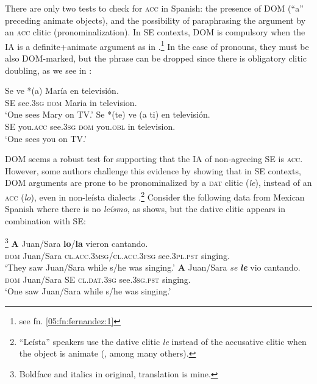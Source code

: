 \documentclass[output=paper,colorlinks,citecolor=brown]{langscibook}
\begin{document}
There are only two tests to check for \textsc{acc} in Spanish: the presence of DOM (``a'' preceding animate objects), and the possibility of paraphrasing the argument by an \textsc{acc} clitic (pronominalization). In SE contexts, DOM is compulsory when the IA is a definite+animate argument as in .\footnote{see fn. \ref{05:fn:fernandez:1}} In the case of pronouns, they must be also DOM-marked, but the phrase can be dropped since there is obligatory clitic doubling, as we see in :

\ea\label{ex:05:DOM}
    \ea \label{ex:05:DOMa}
        \gll Se ve *(a) María en televisión. \\
        SE see.\textsc{3sg} \textsc{dom} Maria in television. \\
        \glt `One sees Mary on TV.'
    \ex \label{ex:05:DOMb}
        \gll Se *(te) ve (a ti) en televisión. \\
        SE you.\textsc{acc} see.\textsc{3sg} \textsc{dom} you.\textsc{obl} in television. \\
        \glt `One sees you on TV.'
\z \z

DOM seems a robust test for supporting that the IA of non-agreeing SE is \textsc{acc}. However, some authors challenge this evidence by showing that in SE contexts, DOM arguments are prone to be pronominalized by a \textsc{dat} clitic (\textit{le}), instead of an \textsc{acc} (\textit{lo}), even in non-leísta dialects \citep{Mendikoetxea1999,OrdonezTrevino2016}.\footnote{``Leísta'' speakers use the dative clitic \textit{le} instead of the accusative clitic when the object is animate (\citealt{Fernandez-Ordonez1999}, among many others).} Consider the following data from Mexican Spanish where there is no \textit{leísmo}, as  shows, but the dative clitic appears in combination with SE:

\ea\label{ex:05:leísmo}         \citet[240]{OrdonezTrevino2016}\footnote{Boldface and italics in original, translation is mine.}
    \ea  \label{ex:05:leísmoa}
        \gll \textbf{A} Juan/Sara \textbf{lo}/{\textbf{la}} vieron cantando.\\
        \textsc{dom} Juan/Sara \textsc{cl.acc.3msg/cl.acc.3fsg}  see.\textsc{3pl.pst} singing. \\
        \glt `They saw Juan/Sara while s/he was singing.'
    \ex \label{ex:05:leísmob}
        \gll \textbf{A} Juan/Sara \textit{se} \textbf{\textit{le}} vio cantando.\\
        \textsc{dom} Juan/Sara SE \textsc{cl.dat.3sg}  see.\textsc{3sg.pst} singing. \\
        \glt `One saw Juan/Sara while s/he was singing.'
\z \z
\end{document}
